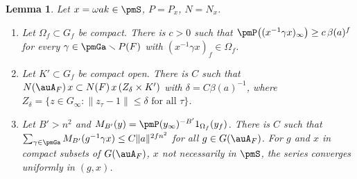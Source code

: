 \documentclass[10pt]{amsart}
\newtheorem{lemma}[theorem]{Lemma}
\theoremstyle{definition}
\theoremstyle{remark}
\begin{document}
\begin{lemma}\label{pm:siegel}
Let $x=\omega ak\in\pmS$, $P=P_x$, $N=N_x$.
\begin{enumerate}
\item[(a)] Let $\Omega_f\subset G_f$ be compact. There is $c>0$ such that
$\pmP\bigl((x^{-1}\gamma x)_\infty\bigr)\ge c\,\beta(a)^{f}$ for every $\gamma\in\pmGa\smallsetminus
P(F)$ with $(x^{-1}\gamma x)_f\in\Omega_f$.
\item[(b)] Let $K'\subset G_f$ be compact open. There is $C$ such that $N(\auA_F)\,x\subset
N(F)\,x\,(Z_\delta\times K')$ with $\delta=C\beta(a)^{-1}$, where $Z_\delta=\{z\in G_\infty:
\|z_\tau-1\|\le\delta\text{ for all }\tau\}$.
\item[(c)] Let $B'>n^2$ and $M_{B'}(y)=\pmP(y_\infty)^{-B'}1_{\Omega_f}(y_f)$. There is $C$ such that
$\sum_{\gamma\in\pmGa}M_{B'}(g^{-1}\gamma x)\le C\|a\|^{2fn^2}$ for all $g\in G(\auA_F)$. For $g$ and $x$ in compact subsets of $G(\auA_F)$, $x$ not necessarily in $\pmS$, the series converges
uniformly in $(g,x)$.
\end{enumerate}
\end{lemma}
\end{document}
